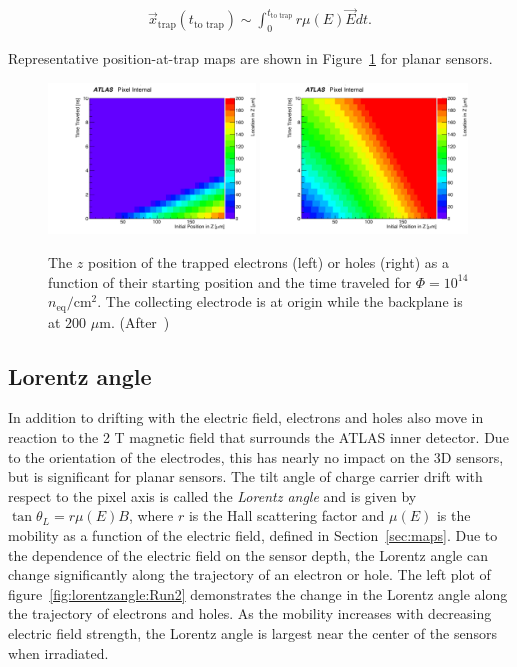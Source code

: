 \begin{align}
\label{eq:traptimetoelectrode}
\vec{x}_\text{trap}(t_\text{to trap})\sim\int_\text{$0$}^\text{$t_\text{to trap}$}r\mu(E)\vec{E}dt.
\end{align}

\noindent Representative position-at-trap maps are shown in Figure~\ref{fig:posattrap} for planar sensors.  

\begin{figure}[!htpb]
\centering
\includegraphics[width=0.49\textwidth]{newdistance_maps_e1e14.pdf}
\includegraphics[width=0.49\textwidth]{newdistance_maps_h1e14.pdf}
\caption{The $z$ position of the trapped electrons (left) or holes (right) as a function of their starting position and the time traveled for $\Phi=10^{14}$ $n_\text{eq}/\text{cm}^2$.  The collecting electrode is at origin while the backplane is at $200$ $\mu$m.  (After~\cite{Benoit:2255825})}
\label{fig:posattrap}
\end{figure}

\subsection{Lorentz angle}
\label{sec:mapsLorentz}

In addition to drifting with the electric field, electrons and holes also move in reaction to the 2 T magnetic field that surrounds the ATLAS inner detector.  Due to the orientation of the electrodes, this has nearly no impact on the 3D sensors, but is significant for planar sensors.  The tilt angle of charge carrier drift with respect to the pixel axis is called the \textit{Lorentz angle} and is given by $\tan\theta_L=r\mu(E) B$, where $r$ is the Hall scattering factor and $\mu(E)$ is the mobility as a function of the electric field, defined in Section~\ref{sec:maps}.  Due to the dependence of the electric field on the sensor depth, the Lorentz angle can change significantly along the trajectory of an electron or hole.  The left plot of figure~\ref{fig:lorentzangle:Run2} demonstrates the change in the Lorentz angle along the trajectory of electrons and holes.  As the mobility increases with decreasing electric field strength, the Lorentz angle is largest near the center of the sensors when irradiated.

